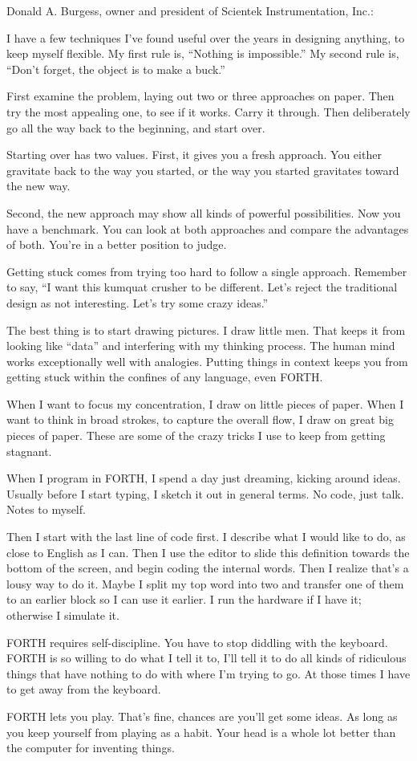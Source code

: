 \blackline{2ex}
Donald A. Burgess, owner and president of Scientek Instrumentation,
Inc.:

\begin{tfquot}
I have a few techniques I've found useful over the years in designing
anything, to keep myself flexible. My first rule is, ``Nothing is impossible.''
My second rule is, ``Don't forget, the object is to make a buck.''

First examine the problem, laying out two or three approaches on paper.
Then try the most appealing one, to see if it works. Carry it through. Then
deliberately go all the way back to the beginning, and start over.

Starting over has two values. First, it gives you a fresh approach. You
either gravitate back to the way you started, or the way you started
gravitates toward the new way.

Second, the new approach may show all kinds of powerful possibilities. Now
you have a benchmark. You can look at both approaches and compare the
advantages of both. You're in a better position to judge.

Getting stuck comes from trying too hard to follow a single approach.
Remember to say, ``I want this kumquat crusher to be different. Let's
reject the traditional design as not interesting. Let's try some crazy
ideas.''

The best thing is to start drawing pictures. I draw little men. That keeps
it from looking like ``data'' and interfering with my thinking process. The
human mind works exceptionally well with analogies. Putting things in
context keeps you from getting stuck within the confines of any language,
even FORTH.

When I want to focus my concentration, I draw on little pieces of paper.
When I want to think in broad strokes, to capture the overall flow, I draw
on great big pieces of paper. These are some of the crazy tricks I use to keep
from getting stagnant.

When I program in FORTH, I spend a day just dreaming, kicking around
ideas. Usually before I start typing, I sketch it out in general terms. No
code, just talk. Notes to myself.

Then I start with the last line of code first. I describe what I would like
to do, as close to English as I can. Then I use the editor to slide this
definition towards the bottom of the screen, and begin coding the internal
words. Then I realize that's a lousy way to do it. Maybe I split my top word
into two and transfer one of them to an earlier block so I can use it earlier.
I run the hardware if I have it; otherwise I simulate it.

FORTH requires self-discipline. You have to stop diddling with the
keyboard. FORTH is so willing to do what I tell it to, I'll tell it to do all
kinds of ridiculous things that have nothing to do with where I'm trying to
go. At those times I have to get away from the keyboard.

FORTH lets you play. That's fine, chances are you'll get some ideas. As
long as you keep yourself from playing as a habit. Your head is a whole lot
better than the computer for inventing things.
\end{tfquot}
